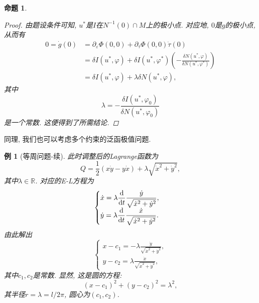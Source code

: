 \documentclass[12pt,a4paper]{article}
\newtheorem{proposition}[theorem]{命题}
\newtheorem{example}[theorem]{例}
\begin{document}
\begin{proposition}
\begin{proof}
        由题设条件可知, $u^*$是$I$在$N^{-1}(0) \cap M$上的极小点. 对应地, $0$是$g$的极小点, 从而有 
        \begin{align*}
            0 = \dot g(0) &= \partial_{\varepsilon}\Phi(0, 0) + \partial_{\tau}\Phi(0, 0)\dot\tau(0) \\ 
            &= \delta I(u^*, \varphi) + \delta I(u^*, \varphi^*)\left(-\frac{\delta N(u^*, \varphi)}{\delta N(u^*, \varphi^*)}\right) \\  
            &= \delta I(u^*, \varphi) + \lambda\delta N(u^*, \varphi), 
        \end{align*}
        其中 
        \begin{equation*}
            \lambda = -\frac{\delta I(u^*, \varphi_0)}{\delta N(u^*, \varphi_0)}
        \end{equation*}
        是一个常数. 这便得到了所需结论.
    \end{proof}
\end{proposition}

同理, 我们也可以考虑多个约束的泛函极值问题.

\begin{example}[等周问题-续]
    此时调整后的Lagrange函数为 
    \begin{equation*}
        Q = \frac{1}{2}(x\dot y - y\dot x) + \lambda \sqrt{\dot x^2 + \dot y^2}, 
    \end{equation*}
    其中$\lambda \in \mathbb{R}$. 对应的E-L方程为 
    \begin{equation*}
        \begin{cases} 
            \displaystyle\dot x = \lambda\frac{{\rm d}}{{\rm d}t}\frac{\dot y}{\sqrt{\dot x^2 + \dot y^2}}, \\  
            \displaystyle\dot y = \lambda\frac{{\rm d}}{{\rm d}t}\frac{\dot x}{\sqrt{\dot x^2 + \dot y^2}}. 
        \end{cases}
    \end{equation*}
    由此解出 
    \begin{equation*}
        \begin{cases} 
            \displaystyle x - c_1 = -\lambda\frac{\dot y}{\sqrt{\dot x^2 + \dot y^2}}, \\ 
            \displaystyle y - c_2 = \lambda\frac{\dot x}{\sqrt{\dot x^2 + \dot y^2}}, 
        \end{cases}
    \end{equation*}
    其中$c_1, c_2$是常数. 显然, 这是圆的方程:
    \begin{equation*}
        (x - c_1)^2 + (y - c_2)^2 = \lambda^2,
    \end{equation*}
    其半径$r = \lambda = l/2\pi$, 圆心为$(c_1, c_2)$.
\end{example}
\end{document}

